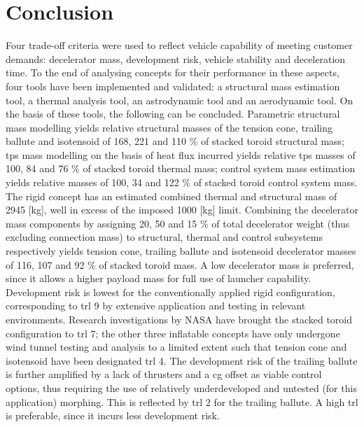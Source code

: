 \section{Conclusion}\label{cha:conclusion}
Four trade-off criteria were used to reflect vehicle capability of meeting customer demands: decelerator mass, development risk, vehicle stability and deceleration time. To the end of analysing concepts for their performance in these aspects, four tools have been implemented and validated: a structural mass estimation tool, a thermal analysis tool, an astrodynamic tool and an aerodynamic tool. On the basis of these tools, the following can be concluded.
\newline
\newline
Parametric structural mass modelling yields relative structural masses of the tension cone, trailing ballute and isotensoid of 168, 221 and 110 \% of stacked toroid structural mass; \acrfull{tps} mass modelling on the basis of heat flux incurred yields relative \gls{tps} masses of 100, 84 and 76 \% of stacked toroid thermal mass; control system mass estimation yields relative masses of 100, 34 and 122 \% of stacked toroid control system mass. The rigid concept has an estimated combined thermal and structural mass of 2945 [kg], well in excess of the imposed 1000 [kg] limit. Combining the decelerator mass components by assigning 20, 50 and 15 \% of total decelerator weight (thus excluding connection mass) to structural, thermal and control subsystems respectively yields tension cone, trailing ballute and isotensoid decelerator masses of 116, 107 and 92 \% of stacked toroid mass. A low decelerator mass is preferred, since it allows a higher payload mass for full use of launcher capability.
\newline
\newline
Development risk is lowest for the conventionally applied rigid configuration, corresponding to \acrfull{trl} 9 by extensive application and testing in relevant environments. Research investigations by NASA have brought the stacked toroid configuration to \gls{trl} 7; the other three inflatable concepts have only undergone wind tunnel testing and analysis to a limited extent such that tension cone and isotensoid have been designated \gls{trl} 4. The development risk of the trailing ballute is further amplified by a lack of thrusters and a \gls{cg} offset as viable control options, thus requiring the use of relatively underdeveloped and untested (for this application) morphing. This is reflected by \gls{trl} 2 for the trailing ballute. A high \gls{trl} is preferable, since it incurs less development risk.
